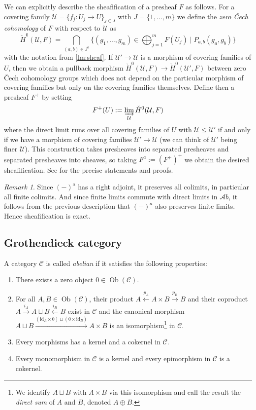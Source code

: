 \documentclass[11pt,A4]{article}
\theoremstyle{plain}
\theoremstyle{definition}
\theoremstyle{remark}
\newtheorem{rem}[thm]{Remark}
\newcommand{\1}{\mathbbm{1}}
\newcommand{\C}{\mathscr{C}}
\newcommand{\Ab}{\mathscr{A}b}
\DeclareMathOperator{\Ob}{Ob}
\newcommand{\op}{\oplus}
\newcommand{\id}{\mathrm{id}}
\begin{document}
We can explicitly describe the sheafification of a presheaf $F$ as follows.
For a covering family $\mathcal{U}=\{f_{j}\colon U_{j}\to U\}_{j\in J}$ with $J=\{1,\ldots,m\}$ we define the \textit{zero \v{C}ech cohomology} of $F$ with respect to $\mathcal{U}$ as
\[ \check{H}^{0}(\mathcal{U},F)=\bigcap_{(a,b)\in J^{2}} \{ (g_{1},\ldots,g_{m})\in \bigoplus_{j=1}^{m}F(U_{j}) \mid P_{a,b}(g_{a},g_{b})\} \]
with the notation from \cref{lm:sheaf}.
If $\mathcal{U}'\to \mathcal{U}$ is a morphism of covering families of $U$, then we obtain a pullback morphism $\check{H}^{0}(\mathcal{U},F)\to \check{H}^{0}(\mathcal{U}',F)$ between zero \v{C}ech cohomology groups which does not depend on the particular morphism of covering families but only on the covering families themselves.
Define then a presheaf $F^{+}$ by setting
\[ F^{+}(U):=\varinjlim_{\mathcal{U}} \check{H}^{0}(\mathcal{U},F) \]
where the direct limit runs over all covering families of $U$ with $\mathcal{U}\leqslant \mathcal{U'}$ if and only if we have a morphism of covering families $\mathcal{U'}\to \mathcal{U}$ (we can think of $\mathcal{U'}$ being finer $\mathcal{U}$).
This construction takes presheaves into separated presheaves and separated presheaves into sheaves, so taking $F^{a}:=(F^{+})^{+}$ we obtain the desired sheafification.
See \cite[\href{https://stacks.math.columbia.edu/tag/03NQ}{Tag 03NQ}]{sta19} for the precise statements and proofs.

\begin{rem}
    Since $(-)^{a}$ has a right adjoint, it preserves all colimits, in particular all finite colimits.
    And since finite limits commute with direct limits in $\Ab$, it follows from the previous description that $(-)^{a}$ also preserves finite limits.
    Hence sheafification is exact.
\end{rem}

\subsection{Grothendieck category}

A category $\C$ is called \textit{abelian} if it satisfies the following properties:
\begin{enumerate}[label=\roman*)]
    \item There exists a zero object $0\in \Ob(\C)$.
    \item For all $A,B\in \Ob(\C)$, their product $A\xleftarrow{p_{A}} A\times B\xrightarrow{p_{B}} B$ and their coproduct $A\xrightarrow{i_{A}}A\sqcup B\xleftarrow{i_{B}} B$ exist in $\C$ and the canonical morphism $A\sqcup B\xrightarrow{(\id_{A}\times 0) \sqcup (0\times \id_{B})} A\times B$ is an isomorphism\footnote{We identify $A\sqcup B$ with $A\times B$ via this isomorphism and call the result the \textit{direct sum} of $A$ and $B$, denoted $A\op B$.} in $\C$.
    \item Every morphisms has a kernel and a cokernel in $\C$.
    \item Every monomorphism in $\C$ is a kernel and every epimorphism in $\C$ is a cokernel.
\end{enumerate}
\end{document}
